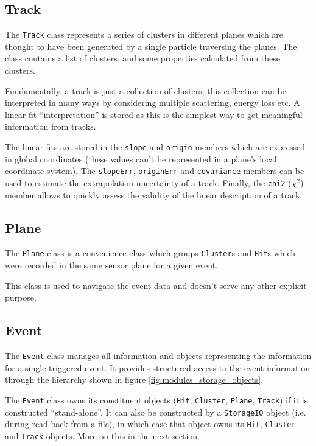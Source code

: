 \documentclass[10pt,a4paper]{book}
\begin{document}
\subsection{Track}

The \Verb`Track` class represents a series of clusters in different planes which are thought to have been generated by a single particle traversing the planes. The class contains a list of clusters, and some properties calculated from these clusters.

Fundamentally, a track is just a collection of clusters; this collection can be interpreted in many ways by considering multiple scattering, energy loss etc. A linear fit ``interpretation'' is stored as this is the simplest way to get meaningful information from tracks.

The linear fits are stored in the \Verb`slope` and \Verb`origin` members which are expressed in global coordinates (these values can't be represented in a plane's local coordinate system). The \Verb`slopeErr`, \Verb`originErr` and \Verb`covariance` members can be used to estimate the extrapolation uncertainty of a track. Finally, the \Verb`chi2` ($\chi^2$) member allows to quickly assess the validity of the linear description of a track.

\subsection{Plane}

The \Verb`Plane` class is a convenience class which groups \Verb`Cluster`s and \Verb`Hit`s which were recorded in the same sensor plane for a given event.

This class is used to navigate the event data and doesn't serve any other explicit purpose.

\subsection{Event}

The \Verb`Event` class manages all information and objects representing the information for a single triggered event. It provides structured access to the event information through the hierarchy shown in figure \ref{fig:modules_storage_objects}.

The \Verb`Event` class owns its constituent objects (\Verb`Hit`, \Verb`Cluster`, \Verb`Plane`, \Verb`Track`) if it is constructed ``stand-alone''. It can also be constructed by a \Verb`StorageIO` object (i.e. during read-back from a file), in which case that object owns its \Verb`Hit`, \Verb`Cluster` and \Verb`Track` objects. More on this in the next section.
\end{document}
